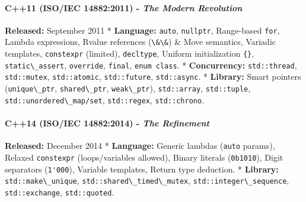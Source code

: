 \hypertarget{c11-isoiec-148822011---the-modern-revolution}{%
\paragraph{\texorpdfstring{\textbf{C++11 (ISO/IEC 14882:2011)} -
\emph{The Modern
Revolution}}{C++11 (ISO/IEC 14882:2011) - The Modern Revolution}}\label{c11-isoiec-148822011---the-modern-revolution}}

\textbf{Released:} September 2011 * \textbf{Language:}
\passthrough{\lstinline!auto!}, \passthrough{\lstinline!nullptr!},
Range-based \passthrough{\lstinline!for!}, Lambda expressions, Rvalue
references (\passthrough{\lstinline!\&\&!}) \& Move semantics, Variadic
templates, \passthrough{\lstinline!constexpr!} (limited),
\passthrough{\lstinline!decltype!}, Uniform initialization
\passthrough{\lstinline!\{\}!},
\passthrough{\lstinline!static\_assert!},
\passthrough{\lstinline!override!}, \passthrough{\lstinline!final!},
\passthrough{\lstinline!enum class!}. * \textbf{Concurrency:}
\passthrough{\lstinline!std::thread!},
\passthrough{\lstinline!std::mutex!},
\passthrough{\lstinline!std::atomic!},
\passthrough{\lstinline!std::future!},
\passthrough{\lstinline!std::async!}. * \textbf{Library:} Smart pointers
(\passthrough{\lstinline!unique\_ptr!},
\passthrough{\lstinline!shared\_ptr!},
\passthrough{\lstinline!weak\_ptr!}),
\passthrough{\lstinline!std::array!},
\passthrough{\lstinline!std::tuple!},
\passthrough{\lstinline!std::unordered\_map/set!},
\passthrough{\lstinline!std::regex!},
\passthrough{\lstinline!std::chrono!}.

\hypertarget{c14-isoiec-148822014---the-refinement}{%
\paragraph{\texorpdfstring{\textbf{C++14 (ISO/IEC 14882:2014)} -
\emph{The
Refinement}}{C++14 (ISO/IEC 14882:2014) - The Refinement}}\label{c14-isoiec-148822014---the-refinement}}

\textbf{Released:} December 2014 * \textbf{Language:} Generic lambdas
(\passthrough{\lstinline!auto!} params), Relaxed
\passthrough{\lstinline!constexpr!} (loops/variables allowed), Binary
literals (\passthrough{\lstinline!0b1010!}), Digit separators
(\passthrough{\lstinline!1'000!}), Variable templates, Return type
deduction. * \textbf{Library:}
\passthrough{\lstinline!std::make\_unique!},
\passthrough{\lstinline!std::shared\_timed\_mutex!},
\passthrough{\lstinline!std::integer\_sequence!},
\passthrough{\lstinline!std::exchange!},
\passthrough{\lstinline!std::quoted!}.

